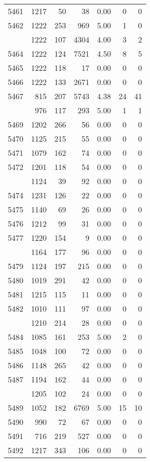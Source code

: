 \documentclass[
]{article}
\begin{document}
\begin{table}
\begin{tabular}[t]{lrrrrrr}
5461 & 1217 & 50 & 38 & 0.00 & 0 & 0\\
5462 & 1222 & 253 & 969 & 5.00 & 1 & 0\\
\addlinespace
5463 & 1222 & 107 & 4304 & 4.00 & 3 & 2\\
5464 & 1222 & 124 & 7521 & 4.50 & 8 & 5\\
5465 & 1222 & 118 & 17 & 0.00 & 0 & 0\\
5466 & 1222 & 133 & 2671 & 0.00 & 0 & 0\\
5467 & 815 & 207 & 5743 & 4.38 & 24 & 41\\
\addlinespace
5468 & 976 & 117 & 293 & 5.00 & 1 & 1\\
5469 & 1202 & 266 & 56 & 0.00 & 0 & 0\\
5470 & 1125 & 215 & 55 & 0.00 & 0 & 0\\
5471 & 1079 & 162 & 74 & 0.00 & 0 & 0\\
5472 & 1201 & 118 & 54 & 0.00 & 0 & 0\\
\addlinespace
5473 & 1124 & 39 & 92 & 0.00 & 0 & 0\\
5474 & 1231 & 126 & 22 & 0.00 & 0 & 0\\
5475 & 1140 & 69 & 26 & 0.00 & 0 & 0\\
5476 & 1212 & 99 & 31 & 0.00 & 0 & 0\\
5477 & 1220 & 154 & 9 & 0.00 & 0 & 0\\
\addlinespace
5478 & 1164 & 177 & 96 & 0.00 & 0 & 0\\
5479 & 1124 & 197 & 215 & 0.00 & 0 & 0\\
5480 & 1019 & 291 & 42 & 0.00 & 0 & 0\\
5481 & 1215 & 115 & 11 & 0.00 & 0 & 0\\
5482 & 1010 & 111 & 97 & 0.00 & 0 & 0\\
\addlinespace
5483 & 1210 & 214 & 28 & 0.00 & 0 & 0\\
5484 & 1085 & 161 & 253 & 5.00 & 2 & 0\\
5485 & 1048 & 100 & 72 & 0.00 & 0 & 0\\
5486 & 1148 & 265 & 42 & 0.00 & 0 & 0\\
5487 & 1194 & 162 & 44 & 0.00 & 0 & 0\\
\addlinespace
5488 & 1205 & 102 & 24 & 0.00 & 0 & 0\\
5489 & 1052 & 182 & 6769 & 5.00 & 15 & 10\\
5490 & 990 & 72 & 67 & 0.00 & 0 & 0\\
5491 & 716 & 219 & 527 & 0.00 & 0 & 0\\
5492 & 1217 & 343 & 106 & 0.00 & 0 & 0\\

\end{tabular}
\end{table}
\end{document}
